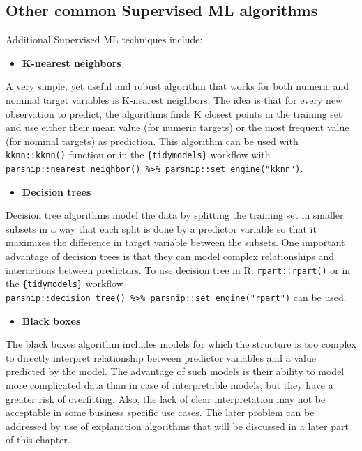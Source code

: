 \documentclass[
]{krantz}
\providecommand{\tightlist}{%
  \setlength{\itemsep}{0pt}\setlength{\parskip}{0pt}}
\begin{document}
\hypertarget{other-common-supervised-ml-algorithms}{%
\subsection{Other common Supervised ML algorithms}\label{other-common-supervised-ml-algorithms}}

Additional Supervised ML techniques include:

\begin{itemize}
\tightlist
\item
  \textbf{K-nearest neighbors}
\end{itemize}

A very simple, yet useful and robust algorithm that works for both numeric and nominal target variables is K-nearest neighbors. The idea is that for every new observation to predict, the algorithms finds K closest points in the training set and use either their mean value (for numeric targets) or the most frequent value (for nominal targets) as prediction. This algorithm can be used with \texttt{kknn::kknn()} function or in the \texttt{\{tidymodels\}} workflow with \texttt{parsnip::nearest\_neighbor()\ \%\textgreater{}\%\ parsnip::set\_engine("kknn")}.

\begin{itemize}
\tightlist
\item
  \textbf{Decision trees}
\end{itemize}

Decision tree algorithms model the data by splitting the training set in smaller subsets in a way that each split is done by a predictor variable so that it maximizes the difference in target variable between the subsets. One important advantage of decision trees is that they can model complex relationships and interactions between predictors. To use decision tree in R, \texttt{rpart::rpart()} or in the \texttt{\{tidymodels\}} workflow \texttt{parsnip::decision\_tree()\ \%\textgreater{}\%\ parsnip::set\_engine("rpart")} can be used.

\begin{itemize}
\tightlist
\item
  \textbf{Black boxes}
\end{itemize}

The black boxes algorithm includes models for which the structure is too complex to directly interpret relationship between predictor variables and a value predicted by the model. The advantage of such models is their ability to model more complicated data than in case of interpretable models, but they have a greater risk of overfitting. Also, the lack of clear interpretation may not be acceptable in some business specific use cases. The later problem can be addressed by use of explanation algorithms that will be discussed in a later part of this chapter.
\end{document}
